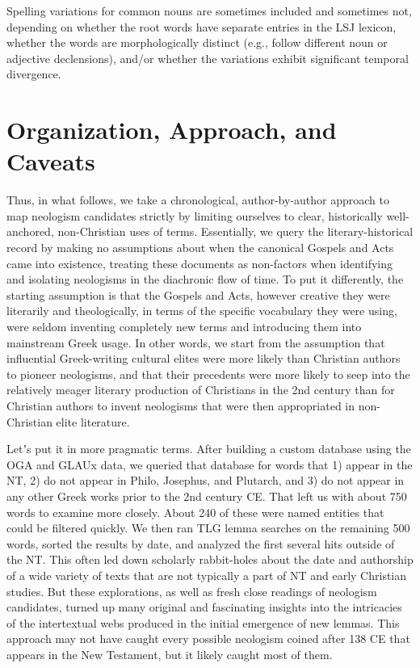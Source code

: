 Spelling variations for common nouns are sometimes included and sometimes not, %
depending on whether the root words have separate entries in the LSJ lexicon, %
whether the words are morphologically distinct (e.g., follow different noun or adjective declensions), %
and/or whether the variations exhibit significant temporal divergence. %

\section{Organization, Approach, and Caveats}

\noindent{}Thus, in what follows, we take a chronological, %
author-by-author approach to map neologism candidates strictly by limiting ourselves to clear, %
historically well-anchored, non-Christian uses of terms. %
Essentially, we query the literary-historical record by making no assumptions about %
when the canonical Gospels and Acts came into existence, %
treating these documents as non-factors when identifying and isolating neologisms %
in the diachronic flow of time. %
To put it differently, the starting assumption is that the Gospels and Acts, %
however creative they were literarily and theologically, %
in terms of the specific vocabulary they were using, %
were seldom inventing completely new terms and introducing them into mainstream Greek usage. %
In other words, we start from the assumption that influential Greek-writing %
cultural elites were more likely than Christian authors to pioneer neologisms, %
and that their precedents were more likely to seep into the relatively meager %
literary production of Christians in the 2nd century than for Christian authors %
to invent neologisms that were then appropriated in non-Christian elite literature. %

Letʼs put it in more pragmatic terms. %
After building a custom database using the OGA and GLAUx data, %
we queried that database for words that 1) appear in the NT, %
2) do not appear in Philo, Josephus, and Plutarch, %
and 3) do not appear in any other Greek works prior to the 2nd century CE. %
That left us with about 750 words to examine more closely. %
About 240 of these were named entities that could be filtered quickly. %
We then ran TLG lemma searches on the remaining 500 words, sorted the results by date, %
and analyzed the first several hits outside of the NT. %
This often led down scholarly rabbit-holes about the %
date and authorship of a wide variety of texts %
that are not typically a part of NT and early Christian studies. %
But these explorations, as well as fresh close readings of neologism candidates, %
turned up many original and fascinating insights into the intricacies %
of the intertextual webs produced in the initial emergence of new lemmas. %
This approach may not have caught every possible neologism coined after 138 CE %
that appears in the New Testament, but it likely caught most of them. %

